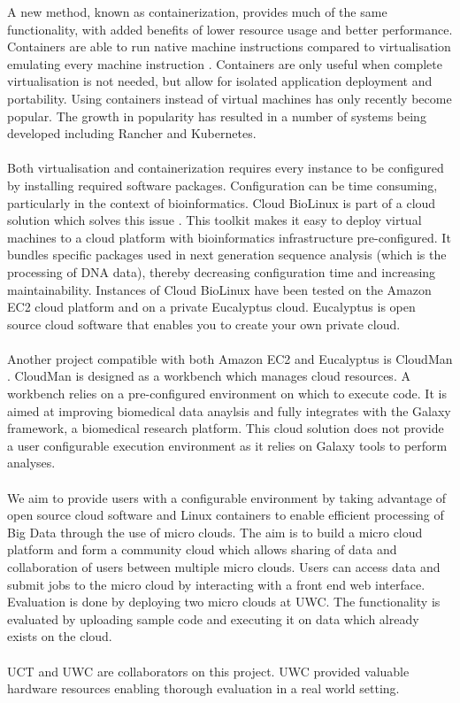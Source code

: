 \documentclass{sig-alternate-05-2015}
\begin{document}
A new method, known as containerization, provides much of the same functionality, with added benefits of lower resource usage and better performance. Containers are able to run native machine instructions compared to virtualisation emulating every machine instruction \cite{dua2014virtualization}. Containers are only useful when complete virtualisation is not needed, but allow for isolated application deployment and portability. Using containers instead of virtual machines has only recently become popular. The growth in popularity has resulted in a number of systems being developed including Rancher and Kubernetes. 
\\\\
Both virtualisation and containerization requires every instance to be configured by installing required software packages. Configuration can be time consuming, particularly in the context of bioinformatics. Cloud BioLinux is part of a cloud solution which solves this issue \cite{krampis2012cloud}. This toolkit makes it easy to deploy virtual machines to a cloud platform with bioinformatics infrastructure pre-configured. It bundles specific packages used in next generation sequence analysis (which is the processing of DNA data), thereby decreasing configuration time and increasing maintainability. Instances of Cloud BioLinux have been tested on the Amazon EC2 cloud platform and on a private Eucalyptus cloud. Eucalyptus is open source cloud software that enables you to create your own private cloud.
\\\\
Another project compatible with both Amazon EC2 and Eucalyptus is CloudMan \cite{afgan2015building}. CloudMan is designed as a workbench which manages cloud resources. A workbench relies on a pre-configured environment on which to execute code. It is aimed at improving biomedical data anaylsis and fully integrates with the Galaxy framework, a biomedical research platform. This cloud solution does not provide a user configurable execution environment as it relies on Galaxy tools to perform analyses. 
\\\\
We aim to provide users with a configurable environment by taking advantage of open source cloud software and Linux containers to enable efficient processing of Big Data through the use of micro clouds. The aim is to build a micro cloud platform and form a community cloud which allows sharing of data and collaboration of users between multiple micro clouds. Users can access data and submit jobs to the micro cloud by interacting with a front end web interface. Evaluation is done by deploying two micro clouds at UWC. The functionality is evaluated by uploading sample code and executing it on data which already exists on the cloud.
\\\\
UCT and UWC are collaborators on this project. UWC provided valuable hardware resources enabling thorough evaluation in a real world setting.
\end{document}
